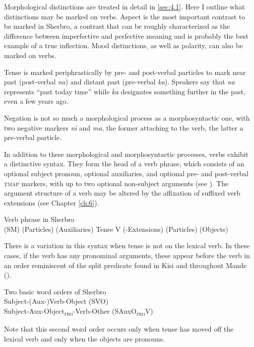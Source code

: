 Morphological distinctions are treated in detail in    \ref{sec:4.1}. Here I outline what distinctions may be marked on verbs. Aspect is the most important contrast to be marked in Sherbro, a contrast that can be roughly characterized as the difference between imperfective and perfective meaning and is probably the best example of a true inflection. Mood distinctions, as well as polarity, can also be marked on verbs.

Tense is marked periphrastically by pre- and post-verbal particles to mark near past (post-verbal \textit{na}) and distant past (pre-verbal \textit{ka}). Speakers say that \textit{na} represents “past today time” while \textit{ka} designates something further in the past, even a few years ago.

Negation is not so much a morphological process as a morphosyntactic one, with two negative markers \textit{ni} and \textit{ma}, the former attaching to the verb, the latter a pre-verbal particle.

In addition to these morphological and morphosyntactic processes, verbs exhibit a distinctive syntax. They form the head of a verb phrase, which consists of an optional subject pronoun, optional auxiliaries, and optional pre- and post-verbal \textsc{tmap} markers, with up to two optional non-subject arguments (see ). The argument structure of a verb may be altered by the affixation of suffixed verb extensions (see Chapter \ref{ch:6}).

\ea%
    \label{ex:91}
  Verb phrase in Sherbro\\
(SM) (Particles) (Auxiliaries) Tense V (-Extensions) (Particles) (Objects)
\z

There is a variation in this syntax when tense is not on the lexical verb. In these cases, if the verb has any pronominal arguments, these appear before the verb in an order reminiscent of the split predicate found in Kisi and throughout Mande (\citealt{Childs2017}).

\ea%
    \label{ex:92}
    Two basic word orders of Sherbro\\

    
	Subject-(Aux-)Verb-Object (SVO)\\
	Subject-Aux-Object\textsc{\textsubscript{pro}}{}-Verb-Other (SAuxO\textsc{\textsubscript{pro}}V)
\z

Note that this second word order occurs only when tense has moved off the lexical verb and only when the objects are pronouns.

